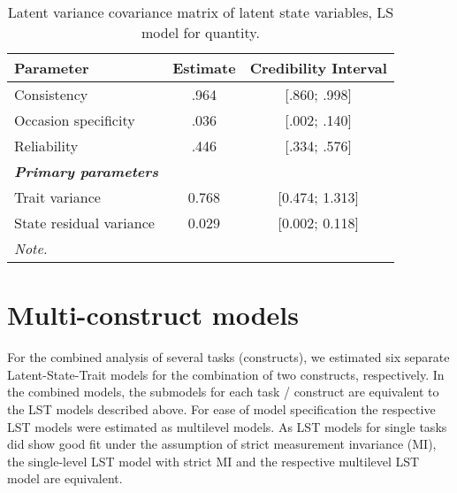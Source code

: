 \begin{table}[H]
 \setlength{\tabcolsep}{1mm}
 \begin{center}
        \caption[Correlation latent State quantity]{Latent variance covariance matrix of latent state variables, LS model for quantity.}
        \label{Tab: correlations LS quantity}
            {\footnotesize
            \begin{tabular}{lcc}
            \hline 
          Parameter & Estimate & Credibility Interval\\
         \hline 
           Consistency & .964 &[.860; .998] \\
           Occasion specificity & .036&[.002; .140] \\
           Reliability &.446& [.334; .576] \\
            \textbf{\textit{Primary parameters}} & & \\
            Trait variance & 0.768& [0.474; 1.313] \\
             State residual variance & 0.029 & [0.002; 0.118] \\
 \hline 
\multicolumn{3}{p{0.4\textwidth}}{\scriptsize{\textit{Note.}}} \\
            \end{tabular}}
        \end{center}
        \end{table}


\section{Multi-construct models}

For the combined analysis of several tasks (constructs), we estimated six separate Latent-State-Trait models for the combination of two constructs, respectively. In the combined models, the submodels for each task / construct are equivalent to the LST models described above. For ease of model specification the respective LST models were estimated as multilevel models. As LST models for single tasks did show good fit under the assumption of strict measurement invariance (MI), the single-level LST model with strict MI and the respective multilevel LST model are equivalent. \\

